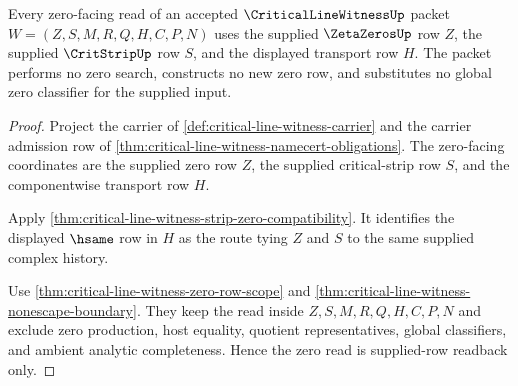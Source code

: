 \begin{theorem}
\label{thm:critical-line-witness-supplied-zero-readback}
Every zero-facing read of an accepted $\CriticalLineWitnessUp$ packet $W=(Z,S,M,R,Q,H,C,P,N)$ uses the supplied $\ZetaZerosUp$ row $Z$, the supplied $\CritStripUp$ row $S$, and the displayed transport row $H$. The packet performs no zero search, constructs no new zero row, and substitutes no global zero classifier for the supplied input.
\end{theorem}
\begin{proof}
Project the carrier of \autoref{def:critical-line-witness-carrier} and the carrier admission row of \autoref{thm:critical-line-witness-namecert-obligations}. The zero-facing coordinates are the supplied zero row $Z$, the supplied critical-strip row $S$, and the componentwise transport row $H$.

Apply \autoref{thm:critical-line-witness-strip-zero-compatibility}. It identifies the displayed $\hsame$ row in $H$ as the route tying $Z$ and $S$ to the same supplied complex history.

Use \autoref{thm:critical-line-witness-zero-row-scope} and \autoref{thm:critical-line-witness-nonescape-boundary}. They keep the read inside $Z,S,M,R,Q,H,C,P,N$ and exclude zero production, host equality, quotient representatives, global classifiers, and ambient analytic completeness. Hence the zero read is supplied-row readback only.
\end{proof}

